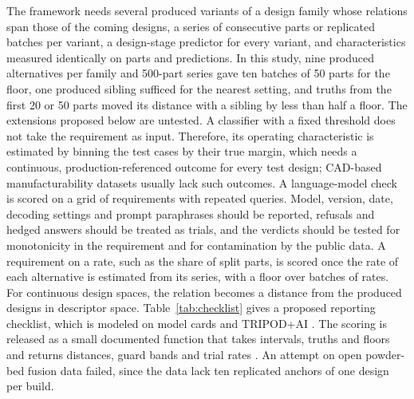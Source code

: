 \documentclass[pdflatex,sn-basic,lineno]{sn-jnl}
\begin{document}
The framework needs several produced variants of a design family whose relations span those of the coming designs, a series of consecutive parts or replicated batches per variant, a design-stage predictor for every variant, and characteristics measured identically on parts and predictions. In this study, nine produced alternatives per family and 500-part series gave ten batches of 50 parts for the floor, one produced sibling sufficed for the nearest setting, and truths from the first 20 or 50 parts moved its distance with a sibling by less than half a floor. The extensions proposed below are untested. A classifier with a fixed threshold does not take the requirement as input. Therefore, its operating characteristic is estimated by binning the test cases by their true margin, which needs a continuous, production-referenced outcome for every test design; CAD-based manufacturability datasets usually lack such outcomes. A language-model check is scored on a grid of requirements with repeated queries. Model, version, date, decoding settings and prompt paraphrases should be reported, refusals and hedged answers should be treated as trials, and the verdicts should be tested for monotonicity in the requirement and for contamination by the public data. A requirement on a rate, such as the share of split parts, is scored once the rate of each alternative is estimated from its series, with a floor over batches of rates. For continuous design spaces, the relation becomes a distance from the produced designs in descriptor space. Table~\ref{tab:checklist} gives a proposed reporting checklist, which is modeled on model cards \citep{mitchell2019model} and TRIPOD+AI \citep{collins2024tripod}. The scoring is released as a small documented function that takes intervals, truths and floors and returns distances, guard bands and trial rates \citep{canseven2026archive}. An attempt on open powder-bed fusion data \citep{leirmo2021data} failed, since the data lack ten replicated anchors of one design per build.
\end{document}

